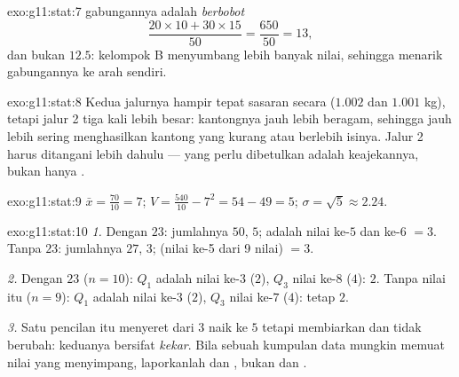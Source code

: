 \begin{solution}{exo:g11:stat:7}
 gabungannya adalah  \emph{berbobot}
\[
\frac{20 \times 10 + 30 \times 15}{50} = \frac{650}{50} = 13,
\]
dan bukan $12.5$: kelompok B menyumbang lebih banyak nilai, sehingga menarik
 gabungannya ke arah  sendiri.
\end{solution}

\begin{solution}{exo:g11:stat:8}
Kedua jalurnya hampir tepat sasaran secara  ($1.002$ dan $1.001$ kg),
tetapi  jalur 2 tiga kali lebih besar: kantongnya jauh lebih
beragam, sehingga jauh lebih sering menghasilkan kantong yang kurang atau
berlebih isinya. Jalur 2 harus ditangani lebih dahulu --- yang perlu dibetulkan
adalah keajekannya, bukan hanya .
\end{solution}

\begin{solution}{exo:g11:stat:9}
$\bar x = \frac{70}{10} = 7$;
$V = \frac{540}{10} - 7^2 = 54 - 49 = 5$;
$\sigma = \sqrt5 \approx 2.24$.
\end{solution}

\begin{solution}{exo:g11:stat:10}
\emph{1.} Dengan $23$: jumlahnya $50$,  $5$;  adalah
 nilai ke-$5$ dan ke-$6$ $= 3$. Tanpa $23$: jumlahnya $27$, 
$3$;  (nilai ke-5 dari 9 nilai) $= 3$.

\emph{2.} Dengan $23$ ($n = 10$): $Q_1$ adalah nilai ke-$3$ ($2$), $Q_3$ nilai
ke-$8$ ($4$):  $2$. Tanpa nilai itu ($n = 9$): $Q_1$
adalah nilai ke-$3$ ($2$), $Q_3$ nilai ke-$7$ ($4$): tetap $2$.

\emph{3.} Satu pencilan itu menyeret  dari $3$ naik ke $5$ tetapi
membiarkan  dan  tidak berubah: keduanya
bersifat \emph{kekar}. Bila sebuah kumpulan data mungkin memuat nilai yang
menyimpang, laporkanlah  dan , bukan 
dan .
\end{solution}

